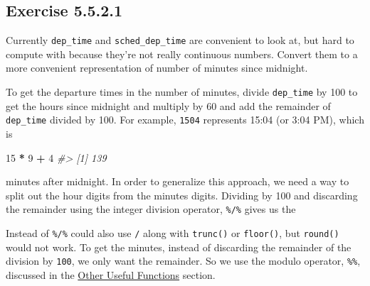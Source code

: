 \documentclass[]{book}
\newenvironment{Shaded}{\begin{snugshade}}{\end{snugshade}}
\newcommand{\CommentTok}[1]{\textcolor[rgb]{0.56,0.35,0.01}{\textit{#1}}}
\newcommand{\DecValTok}[1]{\textcolor[rgb]{0.00,0.00,0.81}{#1}}
\newcommand{\OperatorTok}[1]{\textcolor[rgb]{0.81,0.36,0.00}{\textbf{#1}}}
\newcommand{\StringTok}[1]{\textcolor[rgb]{0.31,0.60,0.02}{#1}}
\theoremstyle{plain}
\theoremstyle{remark}
\begin{document}
\hypertarget{exercise-5.5.2.1}{%
\subsection*{\texorpdfstring{Exercise
{5.5.2.1}}{Exercise 5.5.2.1}}\label{exercise-5.5.2.1}}

Currently \texttt{dep\_time} and \texttt{sched\_dep\_time} are
convenient to look at, but hard to compute with because they're not
really continuous numbers. Convert them to a more convenient
representation of number of minutes since midnight.

To get the departure times in the number of minutes, divide
\texttt{dep\_time} by 100 to get the hours since midnight and multiply
by 60 and add the remainder of \texttt{dep\_time} divided by 100. For
example, \texttt{1504} represents 15:04 (or 3:04 PM), which is

\begin{Shaded}
\begin{Highlighting}[]
\DecValTok{15} \OperatorTok{*}\StringTok{ }\DecValTok{9} \OperatorTok{+}\StringTok{ }\DecValTok{4}
\CommentTok{#> [1] 139}
\end{Highlighting}
\end{Shaded}

minutes after midnight. In order to generalize this approach, we need a
way to split out the hour digits from the minutes digits. Dividing by
100 and discarding the remainder using the integer division operator,
\texttt{\%/\%} gives us the

\begin{Shaded}
\end{Shaded}

Instead of \texttt{\%/\%} could also use \texttt{/} along with
\texttt{trunc()} or \texttt{floor()}, but \texttt{round()} would not
work. To get the minutes, instead of discarding the remainder of the
division by \texttt{100}, we only want the remainder. So we use the
modulo operator, \texttt{\%\%}, discussed in the
\href{http://r4ds.had.co.nz/transform.html\#select}{Other Useful
Functions} section.

\begin{Shaded}
\end{Shaded}
\end{document}

